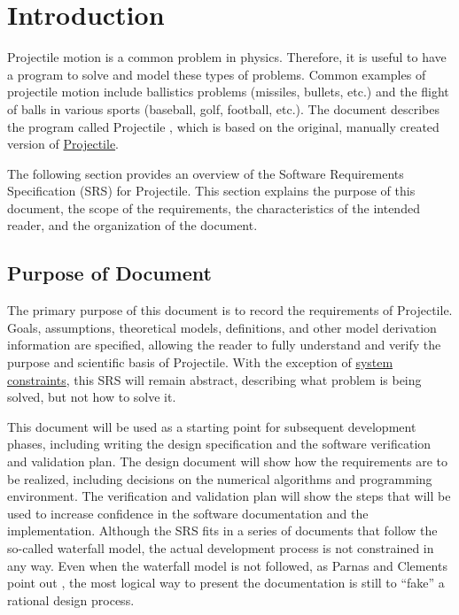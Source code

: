 \documentclass[12pt]{article}
\begin{document}
\section{Introduction}
\label{Sec:Intro}
Projectile motion is a common problem in physics. Therefore, it is useful to have a program to solve and model these types of problems. Common examples of projectile motion include ballistics problems (missiles, bullets, etc.) and the flight of balls in various sports (baseball, golf, football, etc.). The document describes the program called Projectile , which is based on the original, manually created version of \hyperref{https://github.com/smiths/caseStudies/tree/master/CaseStudies/projectile/projectileSRS}{}{}{Projectile}.

The following section provides an overview of the Software Requirements Specification (SRS) for Projectile. This section explains the purpose of this document, the scope of the requirements, the characteristics of the intended reader, and the organization of the document.

\subsection{Purpose of Document}
\label{Sec:DocPurpose}
The primary purpose of this document is to record the requirements of Projectile. Goals, assumptions, theoretical models, definitions, and other model derivation information are specified, allowing the reader to fully understand and verify the purpose and scientific basis of Projectile. With the exception of \hyperref[Sec:SysConstraints]{system constraints}, this SRS will remain abstract, describing what problem is being solved, but not how to solve it.

This document will be used as a starting point for subsequent development phases, including writing the design specification and the software verification and validation plan. The design document will show how the requirements are to be realized, including decisions on the numerical algorithms and programming environment. The verification and validation plan will show the steps that will be used to increase confidence in the software documentation and the implementation. Although the SRS fits in a series of documents that follow the so-called waterfall model, the actual development process is not constrained in any way. Even when the waterfall model is not followed, as Parnas and Clements point out \cite{parnasClements1986}, the most logical way to present the documentation is still to ``fake'' a rational design process.
\end{document}
